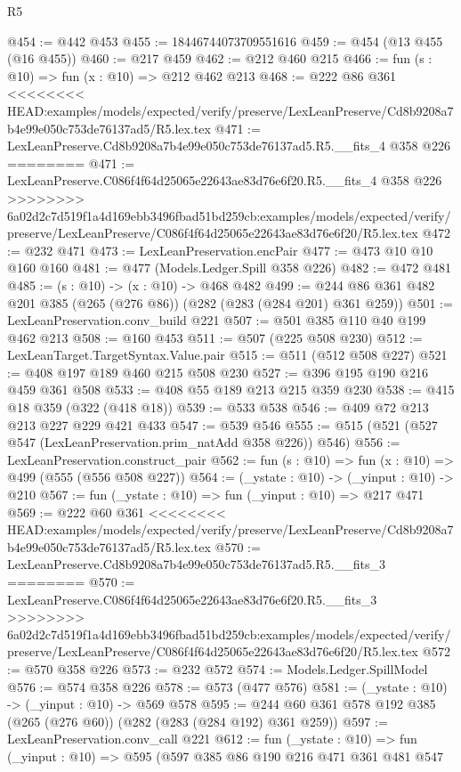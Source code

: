 \begin{lexlean}{R5}
\begin{coremodule}
{{{{{{{{{{{{{@454 := @442 @453
@455 := 18446744073709551616
@459 := @454 (@13 @455 (@16 @455))
@460 := @217 @459
@462 := @212 @460 @215
@466 := fun (s : @10) => fun (x : @10) => @212 @462 @213
@468 := @222 @86 @361
<<<<<<<< HEAD:examples/models/expected/verify/preserve/LexLeanPreserve/Cd8b9208a7b4e99e050c753de76137ad5/R5.lex.tex
@471 := LexLeanPreserve.Cd8b9208a7b4e99e050c753de76137ad5.R5.__fits_4 @358 @226
========
@471 := LexLeanPreserve.C086f4f64d25065e22643ae83d76e6f20.R5.__fits_4 @358 @226
>>>>>>>> 6a02d2c7d519f1a4d169ebb3496fbad51bd259cb:examples/models/expected/verify/preserve/LexLeanPreserve/C086f4f64d25065e22643ae83d76e6f20/R5.lex.tex
@472 := @232 @471
@473 := LexLeanPreservation.encPair
@477 := @473 @10 @10 @160 @160
@481 := @477 (Models.Ledger.Spill @358 @226)
@482 := @472 @481
@485 := (s : @10) -> (x : @10) -> @468 @482
@499 := @244 @86 @361 @482 @201 @385 (@265 (@276 @86)) (@282 (@283 (@284 @201) @361 @259))
@501 := LexLeanPreservation.conv_build @221
@507 := @501 @385 @110 @40 @199 @462 @213
@508 := @160 @453
@511 := @507 (@225 @508 @230)
@512 := LexLeanTarget.TargetSyntax.Value.pair
@515 := @511 (@512 @508 @227)
@521 := @408 @197 @189 @460 @215 @508 @230
@527 := @396 @195 @190 @216 @459 @361 @508
@533 := @408 @55 @189 @213 @215 @359 @230
@538 := @415 @18 @359 (@322 (@418 @18))
@539 := @533 @538
@546 := @409 @72 @213 @213 @227 @229 @421 @433
@547 := @539 @546
@555 := @515 (@521 (@527 @547 (LexLeanPreservation.prim_natAdd @358 @226)) @546)
@556 := LexLeanPreservation.construct_pair
@562 := fun (s : @10) => fun (x : @10) => @499 (@555 (@556 @508 @227))
@564 := (_ystate : @10) -> (_yinput : @10) -> @210
@567 := fun (_ystate : @10) => fun (_yinput : @10) => @217 @471
@569 := @222 @60 @361
<<<<<<<< HEAD:examples/models/expected/verify/preserve/LexLeanPreserve/Cd8b9208a7b4e99e050c753de76137ad5/R5.lex.tex
@570 := LexLeanPreserve.Cd8b9208a7b4e99e050c753de76137ad5.R5.__fits_3
========
@570 := LexLeanPreserve.C086f4f64d25065e22643ae83d76e6f20.R5.__fits_3
>>>>>>>> 6a02d2c7d519f1a4d169ebb3496fbad51bd259cb:examples/models/expected/verify/preserve/LexLeanPreserve/C086f4f64d25065e22643ae83d76e6f20/R5.lex.tex
@572 := @570 @358 @226
@573 := @232 @572
@574 := Models.Ledger.SpillModel
@576 := @574 @358 @226
@578 := @573 (@477 @576)
@581 := (_ystate : @10) -> (_yinput : @10) -> @569 @578
@595 := @244 @60 @361 @578 @192 @385 (@265 (@276 @60)) (@282 (@283 (@284 @192) @361 @259))
@597 := LexLeanPreservation.conv_call @221
@612 := fun (_ystate : @10) =>
  fun (_yinput : @10) =>
  @595
    (@597
      @385
      @86
      @190
      @216
      @471
      @361
      @481
      @547
}}}}}}}}}}}}}
\end{coremodule}
\end{lexlean}
